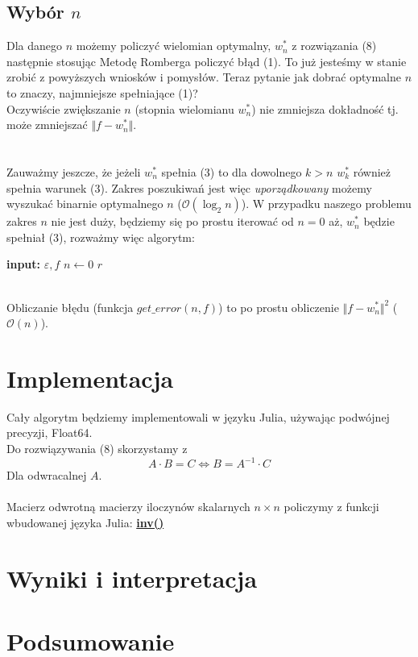 \documentclass{article}
\begin{document}
\subsection*{Wybór $n$}
Dla danego $n$ możemy policzyć wielomian optymalny, $w_n^*$ z rozwiązania (8) następnie stosując Metodę Romberga policzyć błąd (1). To już jesteśmy w stanie zrobić z powyższych wniosków i pomysłów. Teraz pytanie jak dobrać optymalne $n$ to znaczy, najmniejsze spełniające (1)?\\
Oczywiście zwiększanie $n$ (stopnia wielomianu $w_n^*$) nie zmniejsza dokładność tj. może zmniejszać $\Vert f - w_n^*\Vert$.\\\\\\
Zauważmy jeszcze, że jeżeli $w_n^*$ spełnia (3) to dla dowolnego $k > n$ $w_k^*$ również spełnia warunek (3). Zakres poszukiwań jest więc \textit{uporządkowany} możemy wyszukać binarnie optymalnego $n$ ($\mathcal{O}(\log_2{n})$). W przypadku naszego problemu zakres $n$ nie jest duży, będziemy się po prostu iterować od $n = 0$ aż, $w_n^*$ będzie spełniał (3), rozważmy więc algorytm:
\begin{algorithm}
\begin{algorithmic}
\STATE \textbf{input:} $\varepsilon, f$
\STATE $n \leftarrow 0$
\ENDWHILE
\RETURN $r$
\end{algorithmic}
\end{algorithm}
\\Obliczanie błędu (funkcja $get\_error(n,f)$) to po prostu obliczenie $\Vert f - w_n^*\Vert^2$ ($\mathcal{O}({n})$).
\section{Implementacja}
Cały algorytm będziemy implementowali w języku Julia, używając podwójnej
precyzji, Float64.\\
Do rozwiązywania (8) skorzystamy z
$$
A \cdot B = C \iff B = A^{-1}\cdot C
$$
Dla odwracalnej $A$.\\\\
Macierz odwrotną macierzy iloczynów skalarnych $n \times n$ policzymy z funkcji wbudowanej języka Julia: 
\href{https://docs.julialang.org/en/v1/base/math/#Base.inv-Tuple{Number}}{\textbf{inv()}}
\section{Wyniki i interpretacja}
\section{Podsumowanie}
\end{document}
